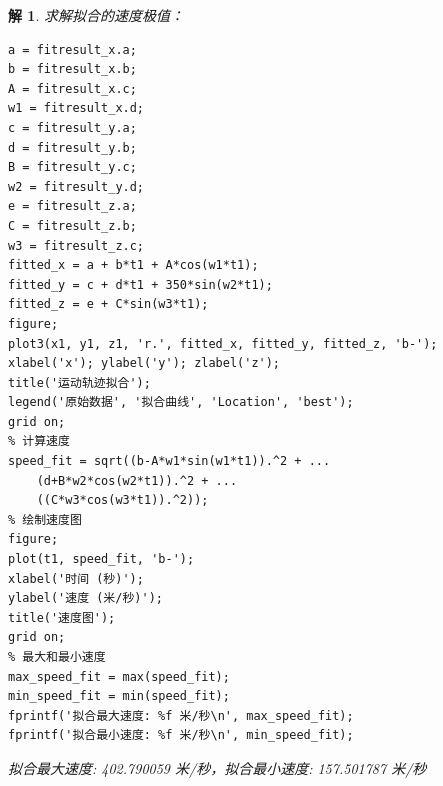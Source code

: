 \documentclass[a4paper, 12pt]{ctexart}
\newtheorem*{theorem}{解}
\begin{document}
\begin{theorem}
    求解拟合的速度极值：
    \begin{lstlisting}
a = fitresult_x.a;
b = fitresult_x.b;
A = fitresult_x.c;
w1 = fitresult_x.d;
c = fitresult_y.a;
d = fitresult_y.b;
B = fitresult_y.c;
w2 = fitresult_y.d;
e = fitresult_z.a;
C = fitresult_z.b;
w3 = fitresult_z.c;
fitted_x = a + b*t1 + A*cos(w1*t1);
fitted_y = c + d*t1 + 350*sin(w2*t1);
fitted_z = e + C*sin(w3*t1);
figure;
plot3(x1, y1, z1, 'r.', fitted_x, fitted_y, fitted_z, 'b-');
xlabel('x'); ylabel('y'); zlabel('z');
title('运动轨迹拟合');
legend('原始数据', '拟合曲线', 'Location', 'best');
grid on;
% 计算速度
speed_fit = sqrt((b-A*w1*sin(w1*t1)).^2 + ...
    (d+B*w2*cos(w2*t1)).^2 + ...
    ((C*w3*cos(w3*t1)).^2));
% 绘制速度图
figure;
plot(t1, speed_fit, 'b-');
xlabel('时间 (秒)');
ylabel('速度 (米/秒)');
title('速度图');
grid on;
% 最大和最小速度
max_speed_fit = max(speed_fit);
min_speed_fit = min(speed_fit);
fprintf('拟合最大速度: %f 米/秒\n', max_speed_fit);
fprintf('拟合最小速度: %f 米/秒\n', min_speed_fit);
    \end{lstlisting}
    \begin{figure}[h]
        \centering
        \nonumber
    \end{figure}
    拟合最大速度: 402.790059 米/秒，拟合最小速度: 157.501787 米/秒
\end{theorem}
\end{document}
